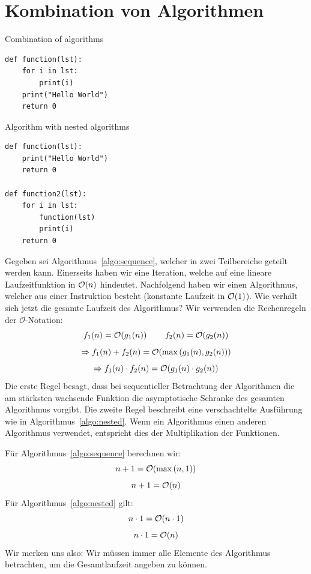 \section{Kombination von Algorithmen}
%
\begin{algorithm}
\caption{Combination of algorithms}
\label{algo:sequence}
\begin{lstlisting}
def function(lst):
    for i in lst:
        print(i)
    print("Hello World")
    return 0
\end{lstlisting}
\end{algorithm}
\begin{algorithm}
\caption{Algorithm with nested algorithms}
\label{algo:nested}
\begin{lstlisting}
def function(lst):
    print("Hello World")
    return 0

def function2(lst):
    for i in lst:
        function(lst)
        print(i)
    return 0
\end{lstlisting}
\end{algorithm}
%
Gegeben sei Algorithmus~\ref{algo:sequence}, welcher in zwei Teilbereiche geteilt werden kann. Einerseits haben wir eine Iteration, welche auf eine lineare Laufzeitfunktion in $\mathcal{O}\!\left(n\right)$ hindeutet. Nachfolgend haben wir einen Algorithmus, welcher aus einer Instruktion besteht (konstante Laufzeit in $\mathcal{O}\!\left(1\right)$). Wie verhält sich jetzt die gesamte Laufzeit des Algorithmus? Wir verwenden die Rechenregeln der $\mathcal{O}$-Notation:
%
\[
  f_1(n) = \mathcal{O}\!\left(g_1(n)\right)  \qquad  f_2(n) = \mathcal{O}\!\left(g_2(n)\right)
\] \[
  \Rightarrow f_1(n) + f_2(n) = \mathcal{O}\!\left(\max{\left(g_1(n), g_2(n)\right)}\right)
\] \[
  \Rightarrow f_1(n) \cdot f_2(n) = \mathcal{O}\!\left(g_1(n) \cdot g_2(n)\right)
\]
%
Die erste Regel besagt, dass bei sequentieller Betrachtung der Algorithmen die am stärksten wachsende Funktion die asymptotische Schranke des gesamten Algorithmus vorgibt. Die zweite Regel beschreibt eine verschachtelte Ausführung wie in Algorithmus~\ref{algo:nested}. Wenn ein Algorithmus einen anderen Algorithmus verwendet, entspricht dies der Multiplikation der Funktionen.

Für Algorithmus~\ref{algo:sequence} berechnen wir:
%
\[
  n + 1 = \mathcal{O}\!\left(\max\left(n, 1\right)\right)
\] \[
  n + 1 = \mathcal{O}\!\left(n\right)
\]
Für Algorithmus~\ref{algo:nested} gilt:
\[
  n \cdot 1 = \mathcal{O}\!\left(n \cdot 1\right)
\] \[
  n \cdot 1 = \mathcal{O}\!\left(n\right)
\]
%
Wir merken uns also: Wir müssen immer alle Elemente des Algorithmus betrachten, um die Gesamtlaufzeit angeben zu können.
%
